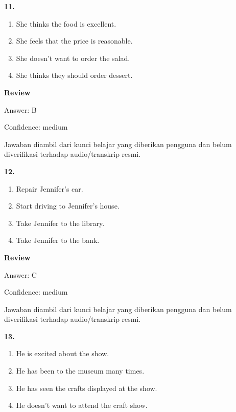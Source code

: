\documentclass[12pt]{article}
\begin{document}
\endgroup
\par
\vspace{0.25\baselineskip}
\noindent\textbf{11.}
\begin{enumerate}[label=(\Alph*),leftmargin=*,itemsep=0.2em]
\item She thinks the food is excellent.
\item She feels that the price is reasonable.
\item She doesn't want to order the salad.
\item She thinks they should order dessert.
\end{enumerate}
\par
\begingroup
\setlength{\parskip}{0pt}
\setlength{\parindent}{0pt}
\textbf{Review}\par
Answer: B\par
Confidence: medium\par
Jawaban diambil dari kunci belajar yang diberikan pengguna dan belum diverifikasi terhadap audio/transkrip resmi.\par
\endgroup
\par
\vspace{0.25\baselineskip}
\noindent\textbf{12.}
\begin{enumerate}[label=(\Alph*),leftmargin=*,itemsep=0.2em]
\item Repair Jennifer's car.
\item Start driving to Jennifer's house.
\item Take Jennifer to the library.
\item Take Jennifer to the bank.
\end{enumerate}
\par
\begingroup
\setlength{\parskip}{0pt}
\setlength{\parindent}{0pt}
\textbf{Review}\par
Answer: C\par
Confidence: medium\par
Jawaban diambil dari kunci belajar yang diberikan pengguna dan belum diverifikasi terhadap audio/transkrip resmi.\par
\endgroup
\par
\vspace{0.25\baselineskip}
\noindent\textbf{13.}
\begin{enumerate}[label=(\Alph*),leftmargin=*,itemsep=0.2em]
\item He is excited about the show.
\item He has been to the museum many times.
\item He has seen the crafts displayed at the show.
\item He doesn't want to attend the craft show.
\end{enumerate}
\end{document}

